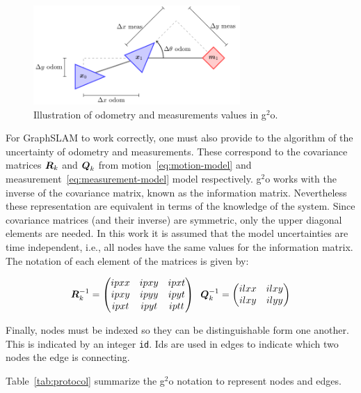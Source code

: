 \begin{figure}[htbp!]
    \centering
    \includegraphics[width=0.7\textwidth]{tikz/protocol.pdf}
    \caption{Illustration of odometry and measurements values in g$^2$o.}
    \label{fig:protocol}
\end{figure}

For GraphSLAM to work correctly, one must also provide to the algorithm of the uncertainty of odometry and measurements. These correspond to the covariance matrices $\boldsymbol{R}_k$ and $\boldsymbol{Q}_k$ from motion~\eqref{eq:motion-model} and measurement~\eqref{eq:measurement-model} model respectively. g$^2$o works with the inverse of the covariance matrix, known as the information matrix. Nevertheless these representation are equivalent in terms of the knowledge of the system. Since covariance matrices (and their inverse) are symmetric, only the upper diagonal elements are needed. In this work it is assumed that the model uncertainties are time independent, i.e., all nodes have the same values for the information matrix. The notation of each element of the matrices is given by:

\begin{equation}
    \boldsymbol{R}^{-1}_k = \begin{pmatrix}
    ipxx & ipxy & ipxt\\
    ipxy & ipyy & ipyt\\
    ipxt & ipyt & iptt
    \end{pmatrix} \;\;
    \boldsymbol{Q}^{-1}_k = \begin{pmatrix}
    ilxx & ilxy\\
    ilxy & ilyy
    \end{pmatrix} 
    \label{eq:info-matrices}
\end{equation}

Finally, nodes must be indexed so they can be distinguishable form one another. This is indicated by an integer \texttt{id}. Ids are used in edges to indicate which two nodes the edge is connecting.

Table~\ref{tab:protocol} summarize the g$^2$o notation to represent nodes and edges.

